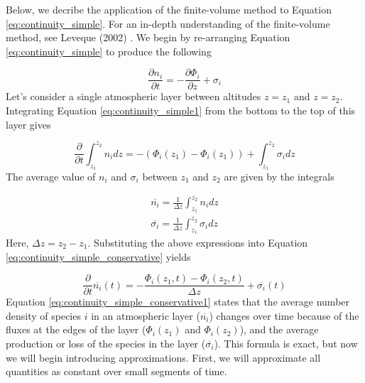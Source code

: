 \documentclass{article}
\begin{document}
Below, we decribe the application of the finite-volume method to Equation \eqref{eq:continuity_simple}. For an in-depth understanding of the finite-volume method, see Leveque (2002) \cite{Leveque_2002}. We begin by re-arranging Equation \eqref{eq:continuity_simple} to produce the following

\begin{equation} \label{eq:continuity_simple1}
  \frac{\partial n_i}{\partial t} = - \frac{\partial \Phi_{i}}{\partial z} + \sigma_i
\end{equation}
Let's consider a single atmospheric layer between altitudes $z = z_1$ and $z = z_2$. Integrating Equation \eqref{eq:continuity_simple1} from the bottom to the top of this layer gives

\begin{equation} \label{eq:continuity_simple_conservative}
  \frac{\partial}{\partial t} \int_{z_1}^{z_2} n_i dz = - (\Phi_{i}(z_1) - \Phi_{i}(z_1)) + \int_{z_1}^{z_2} \sigma_i dz
\end{equation}
The average value of $n_i$ and $\sigma_i$ between $z_1$ and $z_2$ are given by the integrals

\begin{align}
  \overline{n_i} = \frac{1}{\Delta z} \int_{z_1}^{z_2} n_i dz \\
  \overline{\sigma_i} = \frac{1}{\Delta z} \int_{z_1}^{z_2} \sigma_i dz
\end{align}
Here, $\Delta z = z_2 - z_1$. Substituting the above expressions into Equation \eqref{eq:continuity_simple_conservative} yields

\begin{equation} \label{eq:continuity_simple_conservative1}
  \frac{\partial}{\partial t} \overline{n_i}(t) = - \frac{\Phi_{i}(z_1,t) - \Phi_{i}(z_2,t)}{\Delta z} + \overline{\sigma_i}(t)
\end{equation}
Equation \eqref{eq:continuity_simple_conservative1} states that the average number density of species $i$ in an atmospheric layer ($\overline{n_i}$) changes over time because of the fluxes at the edges of the layer ($\Phi_{i}(z_1)$ and $\Phi_{i}(z_2)$), and the average production or loss of the species in the layer ($\overline{\sigma_i}$). This formula is exact, but now we will begin introducing approximations. First, we will approximate all quantities as constant over small segments of time. 


\end{document}
